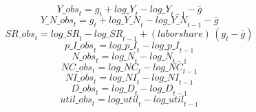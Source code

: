 \begin{dmath}
{Y\_obs}_{t}={{g}}_{t}+{log\_Y}_{t}-{log\_Y}_{t-1}-{{\overline{g}}}
\end{dmath}
\begin{dmath}
{Y\_N\_obs}_{t}={{g}}_{t}+{log\_Y\_N}_{t}-{log\_Y\_N}_{t-1}-{{\overline{g}}}
\end{dmath}
\begin{dmath}
{SR\_obs}_{t}={log\_SR}_{t}-{log\_SR}_{t-1}+{(labor share)}\, \left({{g}}_{t}-{{\overline{g}}}\right)
\end{dmath}
\begin{dmath}
{p\_I\_obs}_{t}={log\_p\_I}_{t}-{log\_p\_I}_{t-1}
\end{dmath}
\begin{dmath}
{N\_obs}_{t}={log\_N}_{t}-{log\_N}_{t-1}
\end{dmath}
\begin{dmath}
{NC\_obs}_{t}={log\_NC}_{t}-{log\_NC}_{t-1}
\end{dmath}
\begin{dmath}
{NI\_obs}_{t}={log\_NI}_{t}-{log\_NI}_{t-1}
\end{dmath}
\begin{dmath}
{D\_obs}_{t}={log\_D}_{t}-{log\_D}_{t-1}
\end{dmath}
\begin{dmath}
{util\_obs}_{t}={log\_util}_{t}-{log\_util}_{t-1}
\end{dmath}
